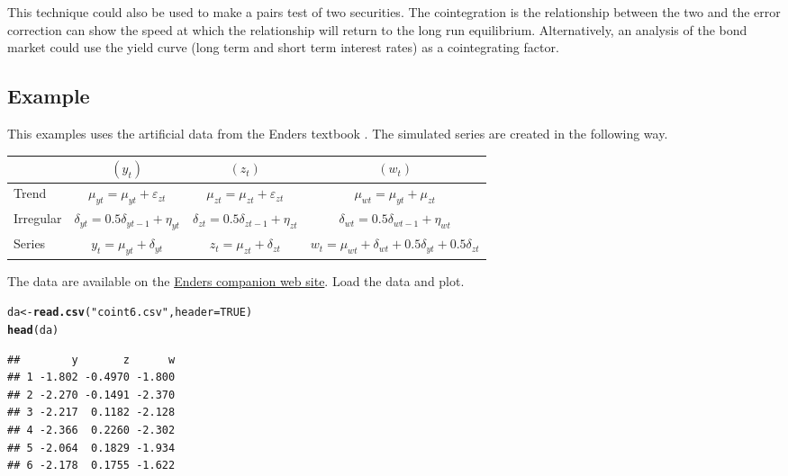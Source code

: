 \documentclass{article}\usepackage{graphicx, color}
\makeatletter
\newcommand{\hlfunctioncall}[1]{\textcolor[rgb]{0.501960784313725,0,0.329411764705882}{\textbf{#1}}}%
\newcommand{\hlstring}[1]{\textcolor[rgb]{0.6,0.6,1}{#1}}%
\newenvironment{kframe}{%
 \def\at@end@of@kframe{}%
 \ifinner\ifhmode%
  \def\at@end@of@kframe{\end{minipage}}%
  \begin{minipage}{\columnwidth}%
 \fi\fi%
 \def\FrameCommand##1{\hskip\@totalleftmargin \hskip-\fboxsep
 \colorbox{shadecolor}{##1}\hskip-\fboxsep
     \hskip-\linewidth \hskip-\@totalleftmargin \hskip\columnwidth}%
 \MakeFramed {\advance\hsize-\width
   \@totalleftmargin\z@ \linewidth\hsize
   \@setminipage}}%
 {\par\unskip\endMakeFramed%
 \at@end@of@kframe}
\newenvironment{knitrout}{}{} %
\makeatother
\begin{document}
This technique could also be used to make a pairs test of two securities.  The cointegration is the relationship between the two and the error correction can show the speed at which the relationship will return to the long run equilibrium.  Alternatively, an analysis of the bond market could use the yield curve (long term and short term interest rates) as a cointegrating factor.  

\subsection{Example}
This examples uses the artificial data from the Enders textbook \citep[pp. 377-379]{EndersTS}.  The simulated series are created in the following way.

\begin{tabular}[l]{l | c | c | c}
 &  $(y_t)$ & $(z_t)$ & $(w_t)$ \\
 \hline
 Trend & $\mu_{yt} = \mu_{yt} + \varepsilon_{zt}$ & $\mu_{zt} = \mu_{zt} + \varepsilon_{zt}$ & $\mu_{wt} = \mu_{yt} + \mu_{zt}$\\
 Irregular & $\delta_{yt} = 0.5 \delta_{yt-1} + \eta_{yt}$ & $\delta_{zt} =0.5 \delta_{zt-1} + \eta_{zt}$ & $\delta_{wt} = 0.5 \delta_{wt-1} + \eta_{wt}$\\
 Series & $y_t = \mu_{yt} +\delta_{yt}$ & $z_t = \mu_{zt} + \delta_{zt}$ & $w_t = \mu_{wt} + \delta_{wt} + 0.5 \delta_{yt} + 0.5 \delta_{zt}$
 \end{tabular}
 
The data are available on the \href{http://bcs.wiley.com/he-bcs/Books?action=resource&bcsId=5276&itemId=0470505397&resourceId=18503}{Enders companion web site}.  Load the data and plot.
\begin{knitrout}
\color{fgcolor}\begin{kframe}
\begin{alltt}
da <- \hlfunctioncall{read.csv}(\hlstring{"coint6.csv"}, header = TRUE)
\hlfunctioncall{head}(da)
\end{alltt}
\begin{verbatim}
##        y       z      w
## 1 -1.802 -0.4970 -1.800
## 2 -2.270 -0.1491 -2.370
## 3 -2.217  0.1182 -2.128
## 4 -2.366  0.2260 -2.302
## 5 -2.064  0.1829 -1.934
## 6 -2.178  0.1755 -1.622
\end{verbatim}
\end{kframe}
\end{knitrout}
\end{document}
